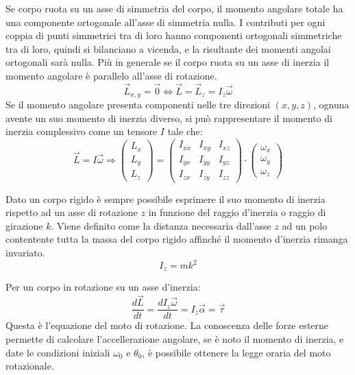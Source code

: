 \documentclass{article}
\numberwithin{equation}{subsection}
\begin{document}
Se corpo ruota su un asse di simmetria del corpo, il momento angolare totale ha una componente ortogonale all'asse di simmetria nulla. I contributi per ogni coppia di 
punti simmetrici tra di loro hanno componenti ortogonali simmetriche tra di loro, quindi si bilanciano a vicenda, e la risultante dei momenti angolai ortogonali sarà nulla. 
Più in generale se il corpo ruota su un asse di inerzia il momento angolare è parallelo all'asse di rotazione. 
\begin{equation}
    \vec{L}_{x,y}=\vec{0}\iff\vec{L}=\vec{L}_z=I_z\vec{\omega}
\end{equation}
Se il momento angolare presenta componenti 
nelle tre direzioni $(x,y,z)$, ognuna avente un suo momento 
di inerzia diverso, si può rappresentare il momento di inerzia 
complessivo come un tensore $I$ tale che:
\begin{equation*}
    \vec{L}=I\vec{\omega}\Rightarrow
    \begin{pmatrix}
        L_x\\
        L_y\\
        L_z
    \end{pmatrix}=
    \begin{pmatrix}
        I_{xx} & I_{xy} & I_{xz}\\
        I_{yx} & I_{yy} & I_{yz}\\
        I_{zx} & I_{zy} & I_{zz}
    \end{pmatrix}\cdot
    \begin{pmatrix}
        \omega_x\\
        \omega_y\\
        \omega_z
    \end{pmatrix}
\end{equation*}

Dato un corpo rigido è sempre possibile esprimere il suo momento di inerzia rispetto ad un asse di rotazione $z$ in funzione del raggio d'inerzia o raggio di girazione $k$. 
Viene definito come la distanza necessaria dall'asse $z$ ad un polo contentente tutta la massa del corpo rigido affinché il momento d'inerzia rimanga invariato. 
\begin{equation*}
    I_z=mk^2
\end{equation*}




Per un corpo in rotazione su un asse d'inerzia: 
\begin{equation}
    \displaystyle\frac{d\vec{L}}{dt}=\frac{dI_z\vec{\omega}}{dt}=I_z\vec{\alpha}=\vec{\tau}
\end{equation}
Questa è l'equazione del moto di rotazione. La conoscenza delle forze esterne permette di calcolare l'accellerazione angolare, se è noto il momento di inerzia, e date 
le condizioni iniziali $\omega_0$ e $\theta_0$, è possibile ottenere la legge oraria del moto rotazionale. 
\end{document}
